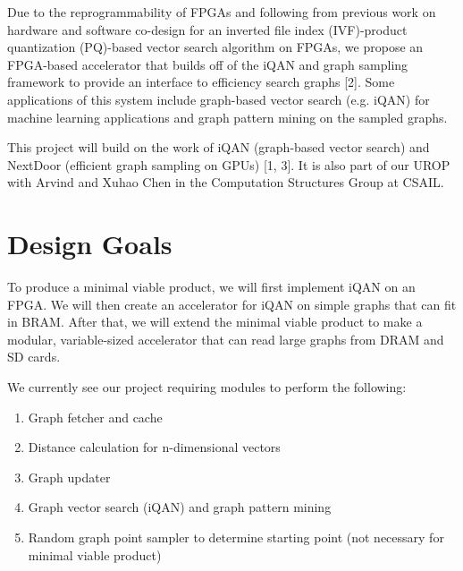 \documentclass{article}
\begin{document}
Due to the reprogrammability of FPGAs and following from previous work on hardware and software co-design for an inverted file index (IVF)-product quantization (PQ)-based vector search algorithm on FPGAs, we propose an FPGA-based accelerator that builds off of the iQAN and graph sampling framework to provide an interface to efficiency search graphs [2]. 
Some applications of this system include graph-based vector search (e.g. iQAN) for machine learning applications and graph pattern mining on the sampled graphs.


This project will build on the work of iQAN (graph-based vector search) and NextDoor (efficient graph sampling on GPUs) [1, 3]. It is also part of our UROP with Arvind and Xuhao Chen in the Computation Structures Group at CSAIL.

\section*{Design Goals}
To produce a minimal viable product, we will first implement iQAN on an FPGA. We will then create an accelerator for iQAN on simple graphs that can fit in BRAM. After that, we will extend the minimal viable product to make a modular, variable-sized accelerator that can read large graphs from DRAM and SD cards.

We currently see our project requiring modules to perform the following:
\begin{enumerate}
    \item Graph fetcher and cache
    \item Distance calculation for n-dimensional vectors
    \item Graph updater
    \item Graph vector search (iQAN) and graph pattern mining
    \item Random graph point sampler to determine starting point (not necessary for minimal viable product)
\end{enumerate}
\end{document}
